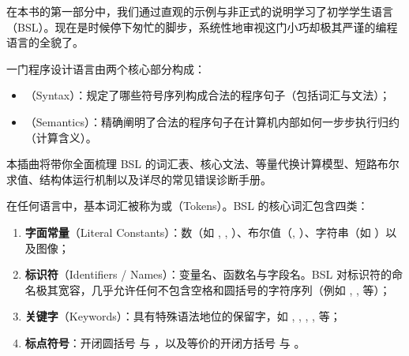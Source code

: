 
\label{sec:intermezzo01}

在本书的第一部分中，我们通过直观的示例与非正式的说明学习了初学学生语言（BSL）。现在是时候停下匆忙的脚步，系统性地审视这门小巧却极其严谨的编程语言的全貌了。

一门程序设计语言由两个核心部分构成：
\begin{itemize}
  \item {}（Syntax）：规定了哪些符号序列构成合法的程序句子（包括词汇与文法）；
  \item {}（Semantics）：精确阐明了合法的程序句子在计算机内部如何一步步执行归约（计算含义）。
\end{itemize}

本插曲将带你全面梳理 BSL 的词汇表、核心文法、等量代换计算模型、短路布尔求值、结构体运行机制以及详尽的常见错误诊断手册。

\label{sec:int01_vocabulary}

在任何语言中，基本词汇被称为或（Tokens）。BSL 的核心词汇包含四类：
\begin{enumerate}
  \item \textbf{字面常量}（Literal Constants）：数（如 , , ）、布尔值（, ）、字符串（如 ）以及图像；
  \item \textbf{标识符}（Identifiers / Names）：变量名、函数名与字段名。BSL 对标识符的命名极其宽容，几乎允许任何不包含空格和圆括号的字符序列（例如 , ,  等）；
  \item \textbf{关键字}（Keywords）：具有特殊语法地位的保留字，如 , , , ,  等；
  \item \textbf{标点符号}：开闭圆括号 \code{(} 与 \code{)}，以及等价的开闭方括号 \code{[} 与 \code{]}。
\end{enumerate}

